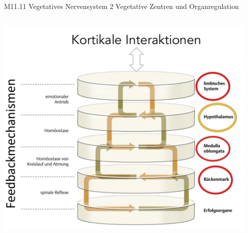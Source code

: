 \documentclass{beamer}
\begin{document}
 
\begin{frame}{M11.11 Vegetatives Nervensystem 2 Vegetative Zentren und Organregulation}
    \begin{columns}[c]
    
    \begin{column}{5cm}
    \begin{center}
        \includegraphics[width=\textwidth]{vns2_zentren.png}
    \end{center}
    \end{column}
    
    \begin{column}{5cm}
    

\end{column}
\end{columns}
\end{frame}
\end{document}
